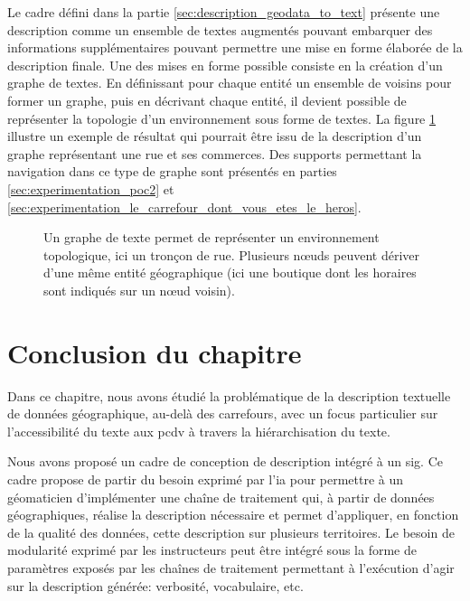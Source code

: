 Le cadre défini dans la partie \ref{sec:description_geodata_to_text} présente une description comme un ensemble de textes augmentés pouvant embarquer des informations supplémentaires pouvant permettre une mise en forme élaborée de la description finale. Une des mises en forme possible consiste en la création d'un graphe de textes. En définissant pour chaque entité un ensemble de voisins pour former un graphe, puis en décrivant chaque entité, il devient possible de représenter la topologie d'un environnement sous forme de textes. La figure \ref{fig:desc_graphe_texte} illustre un exemple de résultat qui pourrait être issu de la description d'un graphe représentant une rue et ses commerces. Des supports permettant la navigation dans ce type de graphe sont présentés en parties \ref{sec:experimentation_poc2} et \ref{sec:experimentation_le_carrefour_dont_vous_etes_le_heros}.

\begin{figure}[ht]
    \centering
    \caption[Graphe de texte d'un tronçon de rue]{Un graphe de texte permet de représenter un environnement topologique, ici un tronçon de rue. Plusieurs nœuds peuvent dériver d'une même entité géographique (ici une boutique dont les horaires sont indiqués sur un nœud voisin).}
    \label{fig:desc_graphe_texte}
\end{figure}

\section{Conclusion du chapitre}

Dans ce chapitre, nous avons étudié la problématique de la description textuelle de données géographique, au-delà des carrefours, avec un focus particulier sur l'accessibilité du texte aux \gls{pcdv} à travers la hiérarchisation du texte. 

\newpar{}

Nous avons proposé un cadre de conception de description intégré à un \gls{sig}. Ce cadre propose de partir du besoin exprimé par l'\gls{ia} pour permettre à un géomaticien d'implémenter une chaîne de traitement qui, à partir de données géographiques, réalise la description nécessaire et permet d'appliquer, en fonction de la qualité des données, cette description sur plusieurs territoires. Le besoin de modularité exprimé par les instructeurs peut être intégré sous la forme de paramètres exposés par les chaînes de traitement permettant à l'exécution d'agir sur la description générée: verbosité, vocabulaire, etc. 

